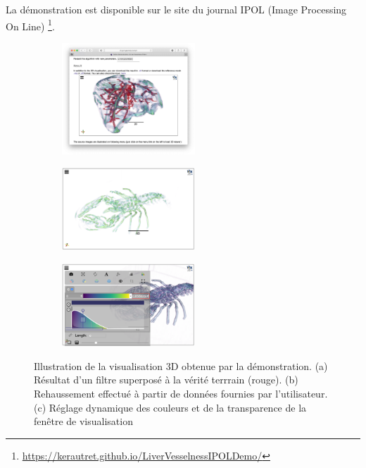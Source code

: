 La démonstration est disponible sur le site du journal IPOL (Image Processing On Line) \footnote{\url{ https://kerautret.github.io/LiverVesselnessIPOLDemo/}}.

\begin{figure}[!t]
\noindent   
\centering
    \begin{subfigure}{0.33\textwidth}
        \centering
        \includegraphics[width=5cm, trim= 4.7cm 5cm 4.7cm 8.5cm, clip=true]{Images/visuDemoViewer.png}
        \caption{ }
    \end{subfigure}
    \begin{subfigure}{0.33\textwidth}
        \centering
        \includegraphics[width=5cm]{Images/visuDemoViewerExtract.png}
        \caption{ }
    \end{subfigure}
    \begin{subfigure}{0.33\textwidth}
        \centering
        \includegraphics[width=5cm]{Images/visuDemoViewerExtract2.png}
        \caption{ }
    \end{subfigure}

  \caption{Illustration de la visualisation 3D obtenue par la démonstration. (a) Résultat d'un filtre superposé à la vérité terrrain (rouge). (b) Rehaussement effectué à partir de données fournies par l'utilisateur. (c) Réglage dynamique des couleurs et de la transparence de la fenêtre de visualisation}
\label{Fig:Illustr3D}
\end{figure}

